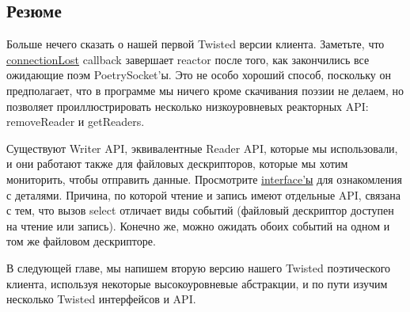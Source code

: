 \subsection{Резюме}



Больше нечего сказать о нашей первой Twisted версии клиента. 
Заметьте, что 
\href{http://github.com/jdavisp3/twisted-intro/blob/master/twisted-client-1/get-poetry.py#L74}{connectionLost} 
callback завершает reactor после того, как закончились все 
ожидающие поэм PoetrySocket'ы. Это не особо хороший способ, 
поскольку он предполагает, что в программе мы ничего кроме 
скачивания поэзии не делаем, но позволяет проиллюстрировать 
несколько низкоуровневых реакторных API: removeReader и getReaders.



Существуют Writer API, эквивалентные Reader API, которые 
мы использовали, и они работают также для файловых дескрипторов, 
которые мы хотим мониторить, чтобы отправить данные. Просмотрите  
\href{http://twistedmatrix.com/trac/browser/tags/releases/twisted-8.2.0/twisted/internet/interfaces.py}{interface'ы} 
для ознакомления с деталями. Причина, по которой чтение и запись 
имеют отдельные API, связана с тем, что вызов select 
отличает виды событий (файловый дескриптор доступен на 
чтение или запись). Конечно же, можно ожидать обоих событий 
на одном и том же файловом дескрипторе. 



В следующей главе, мы напишем вторую версию нашего Twisted 
поэтического клиента, используя некоторые высокоуровневые 
абстракции, и по пути изучим несколько Twisted интерфейсов и 
API. 


